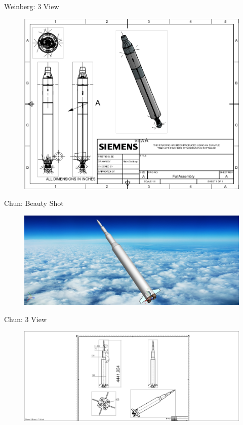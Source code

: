 \documentclass[10pt]{beamer}
\begin{document}
\begin{frame}{Weinberg: 3 View}
\begin{figure}
\centering
\includegraphics[width=\textwidth]{Weinberg_3_View.png}
\end{figure}
\end{frame}

	\begin{frame}{Chun: Beauty Shot}
\begin{figure}
	\centering
	\includegraphics[width=\textwidth]{Chun_Beauty.png}
\end{figure}
\end{frame}

\begin{frame}{Chun: 3 View}
\begin{figure}
\centering
\includegraphics[width=\textwidth]{Chun_3_View.png}
\end{figure}
\end{frame}
\end{document}
